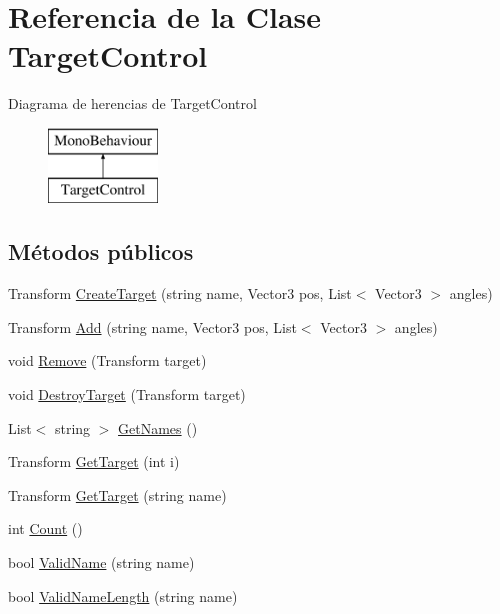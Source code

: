 \hypertarget{class_target_control}{}\section{Referencia de la Clase Target\+Control}
\label{class_target_control}
Diagrama de herencias de Target\+Control\begin{figure}[H]
\begin{center}
\leavevmode
\includegraphics[height=2.000000cm]{class_target_control}
\end{center}
\end{figure}
\subsection*{Métodos públicos}
\begin{DoxyCompactItemize}
\item 
Transform \mbox{\hyperlink{class_target_control_a87c7dc05ecebaef86c6d6be9d8daaa0c}{Create\+Target}} (string name, Vector3 pos, List$<$ Vector3 $>$ angles)
\item 
Transform \mbox{\hyperlink{class_target_control_a5e5fc43fd995ec2863ad896a301fd3c2}{Add}} (string name, Vector3 pos, List$<$ Vector3 $>$ angles)
\item 
void \mbox{\hyperlink{class_target_control_a118416e825413adb6c4c60ac7b08ff69}{Remove}} (Transform target)
\item 
void \mbox{\hyperlink{class_target_control_a728aecb12c800b1989977044e22264bb}{Destroy\+Target}} (Transform target)
\item 
List$<$ string $>$ \mbox{\hyperlink{class_target_control_a0a09ff530caea4a96bbcfe88bd63f238}{Get\+Names}} ()
\item 
Transform \mbox{\hyperlink{class_target_control_a86dcdb984de7099a9db940312a2aa541}{Get\+Target}} (int i)
\item 
Transform \mbox{\hyperlink{class_target_control_ac0274d2169116589048ea53988cdbc34}{Get\+Target}} (string name)
\item 
int \mbox{\hyperlink{class_target_control_a7a5424ff72566de173d0cd19295b2532}{Count}} ()
\item 
bool \mbox{\hyperlink{class_target_control_a6fc8e97f10a1270357d483e629c0a899}{Valid\+Name}} (string name)
\item 
bool \mbox{\hyperlink{class_target_control_a87d8a6a4fdf71334afd9e5d5c6204f90}{Valid\+Name\+Length}} (string name)
\end{DoxyCompactItemize}
